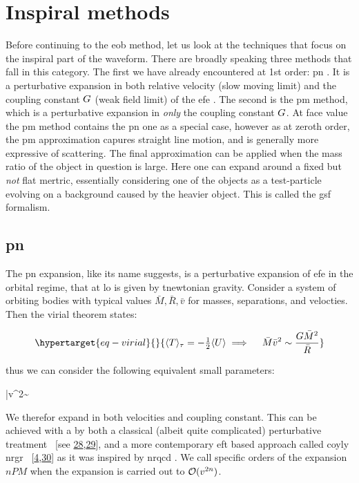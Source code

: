 \documentclass[
  10pt,
  a4paper,
  DIV=11,
  numbers=noendperiod,
  twoside]{scrreprt}
\let\[\relax \let\]\relax %
\DeclareRobustCommand{\[}{\begin{equation}}
\DeclareRobustCommand{\]}{\end{equation}}
\begin{document}
\hypertarget{inspiral-methods}{%
\section{Inspiral methods}\label{inspiral-methods}}

Before continuing to the \gls{eob} method, let us look at the techniques
that focus on the inspiral part of the waveform. There are broadly
speaking three methods that fall in this category. The first we have
already encountered at 1st order: \gls{pn} . It is a perturbative
expansion in both relative velocity (slow moving limit) and the coupling
constant \(\grav\) (weak field limit) of the \gls{efe} . The second is
the \gls{pm} method, which is a perturbative expansion in \emph{only}
the coupling constant \(\grav\). At face value the \gls{pm} method
contains the \gls{pn} one as a special case, however as at zeroth order,
the \gls{pm} approximation capures straight line motion, and is
generally more expressive of scattering. The final approximation can be
applied when the mass ratio of the object in question is large. Here one
can expand around a fixed but \emph{not} flat mertric, essentially
considering one of the objects as a test-particle evolving on a
background caused by the heavier object. This is called the \gls{gsf}
formalism.

\hypertarget{pn}{%
\subsection{\texorpdfstring{\gls{pn}}{}}\label{pn}}

The \gls{pn} expansion, like its name suggests, is a perturbative
expansion of \gls{efe} in the orbital regime, that at \gls{lo} is given
by tnewtonian gravity. Consider a system of orbiting bodies with typical
values \(\bar{M},\bar{R},\bar{v}\) for masses, separations, and
velocties. Then the virial theorem states:

\begin{equation}\protect\hypertarget{eq-virial}{}{
\ang{T}_\tau=-\half \ang{U} \implies \quad \bar{M} \bar{v}^2\sim \frac{G \bar{M}^2}{\bar{R}}
}\label{eq-virial}\end{equation}

thus we can consider the following equivalent small parameters:

\[
\bar{v}^2\sim {}
\]

We therefor expand in both velocities and coupling constant. This can be
achieved with a by both a classical (albeit quite complicated)
perturbative treatment ~{[}see
\protect\hyperlink{ref-Blanchet:2013haa}{28},\protect\hyperlink{ref-Blanchet:1995fg}{29}{]},
and a more contemporary \gls{eft} based approach called coyly \gls{nrgr}
~{[}\protect\hyperlink{ref-Goldberger:2004jt}{4},\protect\hyperlink{ref-Sturani:2021xpq}{30}{]}
as it was inspired by \gls{nrqcd} . We call specific orders of the
expansion \(nPM\) when the expansion is carried out to
\(\order[2n]{v}\).
\end{document}
